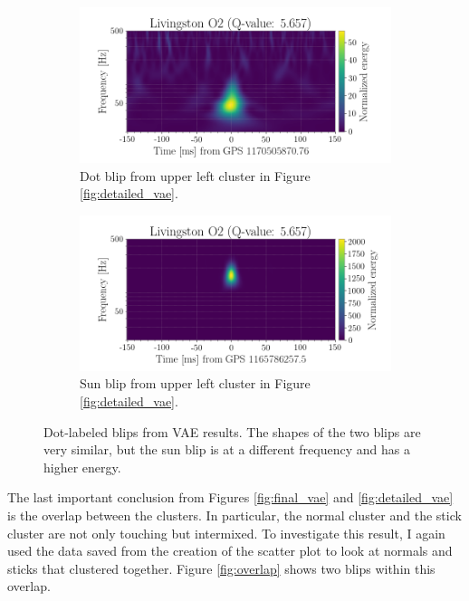 \documentclass[a4paper]{article}
\begin{document}
\begin{figure}[h!]
	\centering
	\begin{subfigure}{.49\textwidth}
		\centering
		\includegraphics[width=1\linewidth]{dot_lowF}
		\caption{Dot blip from upper left cluster in Figure \ref{fig:detailed_vae}.}
		\label{fig:dot_lowf}
	\end{subfigure}
	\begin{subfigure}{.49\textwidth}
		\centering
		\includegraphics[width=1\linewidth]{dot_highF}
		\caption{Sun blip from upper left cluster in Figure \ref{fig:detailed_vae}.}
		\label{fig:dot_highf}
	\end{subfigure}
	\caption{Dot-labeled blips from VAE results. The shapes of the two blips are very similar, but the sun blip is at a different frequency and has a higher energy.}
	\label{fig:two_dots}
\end{figure}

The last important conclusion from Figures \ref{fig:final_vae} and \ref{fig:detailed_vae} is the overlap between the clusters. In particular, the normal cluster and the stick cluster are not only touching but intermixed. To investigate this result, I again used the data saved from the creation of the scatter plot to look at normals and sticks that clustered together. Figure \ref{fig:overlap} shows two blips within this overlap. 
\end{document}
